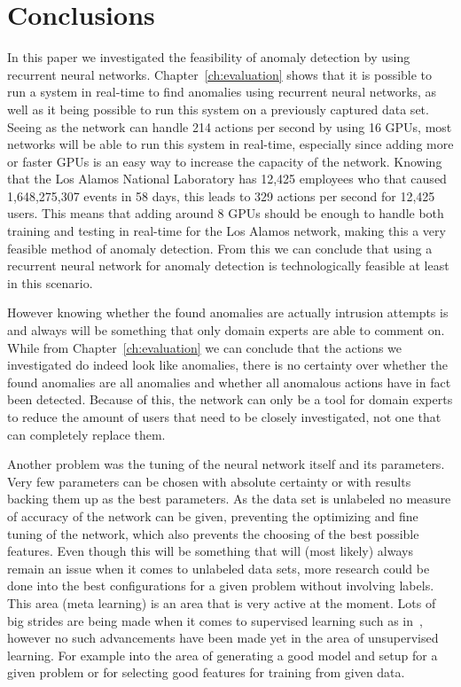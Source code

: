 \chapter{Conclusions}\label{ch:conclusions}

In this paper we investigated the feasibility of anomaly detection by using recurrent neural networks. Chapter~\ref{ch:evaluation} shows that it is possible to run a system in real-time to find anomalies using recurrent neural networks, as well as it being possible to run this system on a previously captured data set. Seeing as the network can handle 214 actions per second by using 16 GPUs, most networks will be able to run this system in real-time, especially since adding more or faster GPUs is an easy way to increase the capacity of the network. Knowing that the Los Alamos National Laboratory has 12,425 employees who that caused 1,648,275,307 events in 58 days, this leads to 329 actions per second for 12,425 users. This means that adding around 8 GPUs should be enough to handle both training and testing in real-time for the Los Alamos network, making this a very feasible method of anomaly detection. From this we can conclude that using a recurrent neural network for anomaly detection is technologically feasible at least in this scenario. 

However knowing whether the found anomalies are actually intrusion attempts is and always will be something that only domain experts are able to comment on. While from Chapter~\ref{ch:evaluation} we can conclude that the actions we investigated do indeed look like anomalies, there is no certainty over whether the found anomalies are all anomalies and whether all anomalous actions have in fact been detected. Because of this, the network can only be a tool for domain experts to reduce the amount of users that need to be closely investigated, not one that can completely replace them. 

Another problem was the tuning of the neural network itself and its parameters. Very few parameters can be chosen with absolute certainty or with results backing them up as the best parameters. As the data set is unlabeled no measure of accuracy of the network can be given, preventing the optimizing and fine tuning of the network, which also prevents the choosing of the best possible features. Even though this will be something that will (most likely) always remain an issue when it comes to unlabeled data sets, more research could be done into the best configurations for a given problem without involving labels. This area (meta learning) is an area that is very active at the moment. Lots of big strides are being made when it comes to supervised learning such as in~\cite{zoph2016neural}, however no such advancements have been made yet in the area of unsupervised learning. For example into the area of generating a good model and setup for a given problem or for selecting good features for training from given data.